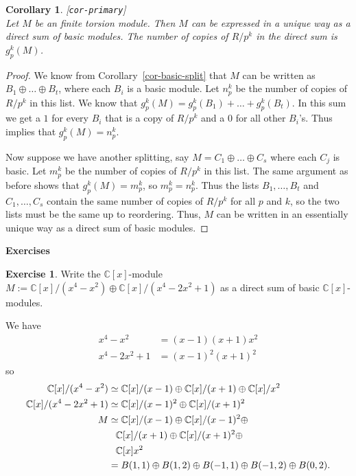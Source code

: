 \documentclass{amsart}
\newcommand{\lbl}[1]{\label{#1}\textup{[\texttt{#1}]}\ \\}
\newcommand{\lbl}{\label}
\newcommand{\C}         {{\mathbb{C}}}
\newcommand{\ip}[1]     {\langle #1\rangle}
\newcommand{\op}        {\oplus}
\renewcommand{\:}{\colon}
\newtheorem{corollary}[theorem]{Corollary}
\theoremstyle{definition}
\newtheorem{exercise}{Exercise}[section]
\renewenvironment{solution}{\SolutionAtEnd}{\endSolutionAtEnd}
\begin{document}
\begin{corollary}\lbl{cor-primary}
 Let $M$ be an finite torsion module.  Then $M$ can be expressed in a
 unique way as a direct sum of basic modules.  The number of copies of
 $R/p^k$ in the direct sum is $g_p^k(M)$.
\end{corollary}
\begin{proof}
 We know from Corollary~\ref{cor-basic-split} that $M$ can be written
 as $B_1\op\ldots\op B_t$, where each $B_i$ is a basic module.  Let
 $n_p^k$ be the number of copies of $R/p^k$ in this list.  We know
 that $g_p^k(M)=g_p^k(B_1)+\ldots+g_p^k(B_t)$.  In this sum we get a
 $1$ for every $B_i$ that is a copy of $R/p^k$ and a $0$ for all other
 $B_i$'s.  Thus implies that $g_p^k(M)=n_p^k$.  

 Now suppose we have another splitting, say $M=C_1\op\ldots\op C_s$
 where each $C_j$ is basic.  Let $m_p^k$ be the number of copies of
 $R/p^k$ in this list.  The same argument as before shows that
 $g_p^k(M)=m_p^k$, so $m_p^k=n_p^k$.  Thus the lists $B_1,\ldots,B_t$
 and $C_1,\ldots,C_s$ contain the same number of copies of $R/p^k$ for
 all $p$ and $k$, so the two lists must be the same up to reordering.
 Thus, $M$ can be written in an essentially unique way as a direct sum
 of basic modules.
\end{proof}


\begin{center}
 \Large \textbf{Exercises}
\end{center}

\begin{exercise}
 Write the $\C[x]$-module $M:=\C[x]/(x^4-x^2)\op\C[x]/(x^4-2x^2+1)$ as a
 direct sum of basic $\C[x]$-modules.
\end{exercise}
\begin{solution}
 We have
 \begin{align*}
  x^4 - x^2 &= (x-1)(x+1)x^2 \\
  x^4-2x^2+1 &= (x-1)^2(x+1)^2 
 \end{align*}
 so 
 \begin{align*}
  \C[x]/(x^4-x^2) &\simeq \C[x]/(x-1) \op \C[x]/(x+1) \op \C[x]/x^2 \\
  \C[x]/(x^4-2x^2+1) &\simeq \C[x]/(x-1)^2 \op \C[x]/(x+1)^2 \\
  M &\simeq \C[x]/(x-1) \op \C[x]/(x-1)^2 \op \\
    &\hphantom{\simeq} \C[x]/(x+1) \op \C[x]/(x+1)^2 \op \\
    &\hphantom{\simeq} \C[x]x^2 \\
    &= B(1,1) \op B(1,2) \op B(-1,1) \op B(-1,2) \op B(0,2).
 \end{align*}
\end{solution}
\end{document}
